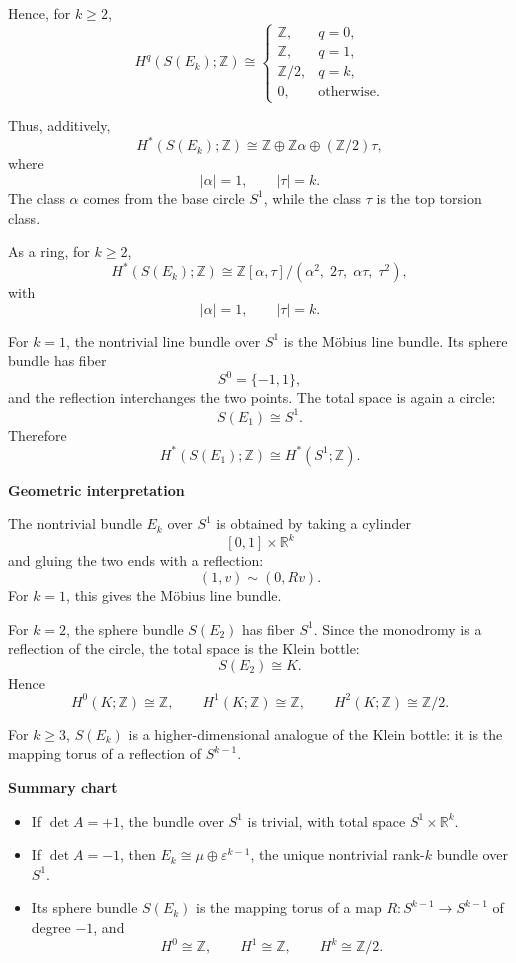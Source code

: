 \begin{solution}
Hence, for \(k\geq 2\),
\[
H^q(S(E_k);\mathbb{Z})
\cong
\begin{cases}
	\mathbb{Z}, & q=0,\\[2mm]
	\mathbb{Z}, & q=1,\\[2mm]
	\mathbb{Z}/2, & q=k,\\[2mm]
	0, & \text{otherwise}.
\end{cases}
\]

Thus, additively,
\[
H^*(S(E_k);\mathbb{Z})
\cong
\mathbb{Z}
\oplus
\mathbb{Z}\alpha
\oplus
(\mathbb{Z}/2)\tau,
\]
where
\[
|\alpha|=1,
\qquad
|\tau|=k.
\]
The class \(\alpha\) comes from the base circle \(S^1\), while the class \(\tau\) is the top torsion class.

As a ring, for \(k\geq 2\),
\[
H^*(S(E_k);\mathbb{Z})
\cong
\mathbb{Z}[\alpha,\tau]
\big/
(\alpha^2,\;2\tau,\;\alpha\tau,\;\tau^2),
\]
with
\[
|\alpha|=1,
\qquad
|\tau|=k.
\]

For \(k=1\), the nontrivial line bundle over \(S^1\) is the Möbius line bundle. Its sphere bundle has fiber
\[
S^0=\{-1,1\},
\]
and the reflection interchanges the two points. The total space is again a circle:
\[
S(E_1)\cong S^1.
\]
Therefore
\[
H^*(S(E_1);\mathbb{Z})
\cong
H^*(S^1;\mathbb{Z}).
\]


\medskip
\noindent\textbf{Geometric interpretation}\par
\smallskip


The nontrivial bundle \(E_k\) over \(S^1\) is obtained by taking a cylinder
\[
[0,1]\times \mathbb{R}^k
\]
and gluing the two ends with a reflection:
\[
(1,v)\sim (0,Rv).
\]
For \(k=1\), this gives the Möbius line bundle.

For \(k=2\), the sphere bundle \(S(E_2)\) has fiber \(S^1\). Since the monodromy is a reflection of the circle, the total space is the Klein bottle:
\[
S(E_2)\cong K.
\]
Hence
\[
H^0(K;\mathbb{Z})\cong \mathbb{Z},
\qquad
H^1(K;\mathbb{Z})\cong \mathbb{Z},
\qquad
H^2(K;\mathbb{Z})\cong \mathbb{Z}/2.
\]

For \(k\geq 3\), \(S(E_k)\) is a higher-dimensional analogue of the Klein bottle: it is the mapping torus of a reflection of \(S^{k-1}\).


\medskip
\noindent\textbf{Summary chart}\par
\smallskip


\begin{itemize}
\item If \(\det A=+1\), the bundle over \(S^1\) is trivial, with total
space \(S^1\times\mathbb R^k\).
\item If \(\det A=-1\), then \(E_k\cong\mu\oplus\varepsilon^{k-1}\), the
unique nontrivial rank-\(k\) bundle over \(S^1\).
\item Its sphere bundle \(S(E_k)\) is the mapping torus of a map
\(R:S^{k-1}\to S^{k-1}\) of degree \(-1\), and
\[
H^0\cong\mathbb Z,\qquad H^1\cong\mathbb Z,\qquad H^k\cong\mathbb Z/2.
\]
\end{itemize}
\end{solution}

